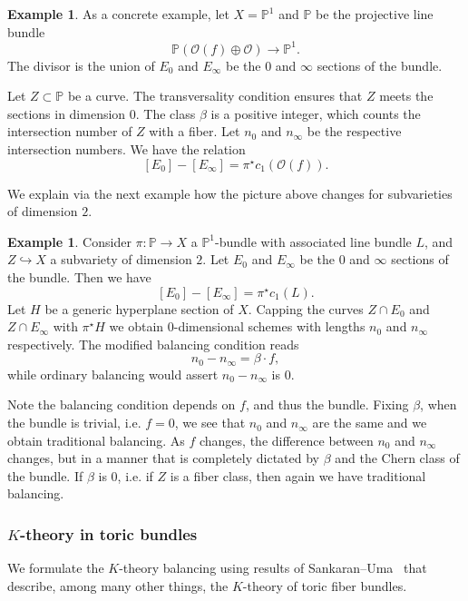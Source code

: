 \documentclass[11pt]{amsart}
\theoremstyle{definition}
\theoremstyle{definition}
\newtheorem{example}[theorem]{Example}
\begin{document}
\begin{example}
As a concrete example, let $X = \mathbb P^1$ and $\mathbb P$ be the projective line bundle
\[
\mathbb P(\mathcal O(f)\oplus\mathcal O)\to \mathbb P^1. 
\]
The divisor is the union of $E_0$ and $E_\infty$ be the $0$ and $\infty$ sections of the bundle. 

Let $Z\subset \mathbb P$ be a curve. The transversality condition ensures that $Z$ meets the sections in dimension $0$. The class $\beta$ is a positive integer, which counts the intersection number of $Z$ with a fiber. Let $n_0$ and $n_\infty$ be the respective intersection numbers. We have the relation
\[
[E_0]-[E_\infty] = \pi^\star c_1(\mathcal O(f)).
\] 

\end{example}

We explain via the next example how the picture above changes for subvarieties of dimension $2$. 

\begin{example} Consider $\pi \colon \mathbb P\to X$ a $\mathbb P^1$-bundle with associated line bundle $L$, and $Z\hookrightarrow X$ a subvariety of dimension $2$. Let $E_0$ and $E_\infty$ be the $0$ and $\infty$ sections of the bundle. Then we have
\[
[E_0]-[E_\infty] = \pi^\star c_1(L).
\] 
Let $H$ be a generic hyperplane section of $X$. Capping the curves $Z\cap E_0$ and $Z\cap E_\infty$ with $\pi^\star H$ we obtain $0$-dimensional schemes with lengths $n_0$ and $n_\infty$ respectively. The modified balancing condition reads
\[
n_0-n_\infty = \beta\cdot f,
\]
while ordinary balancing would assert $n_0-n_\infty$ is $0$. 
\end{example}
Note the balancing condition depends on $f$, and thus the bundle. Fixing $\beta$, when the bundle is trivial, i.e. $f = 0$, we see that $n_0$ and $n_\infty$ are the same and we obtain traditional balancing. As $f$ changes, the difference between $n_0$ and $n_\infty$ changes, but in a manner that is completely dictated by $\beta$ and the Chern class of the bundle. If $\beta$ is $0$, i.e. if $Z$ is a fiber class, then again we have traditional balancing. 

\subsubsection{$K$-theory in toric bundles} We formulate the $K$-theory balancing using results of Sankaran--Uma~\cite{SU03} that describe, among many other things, the $K$-theory of toric fiber bundles. %
\end{document}
